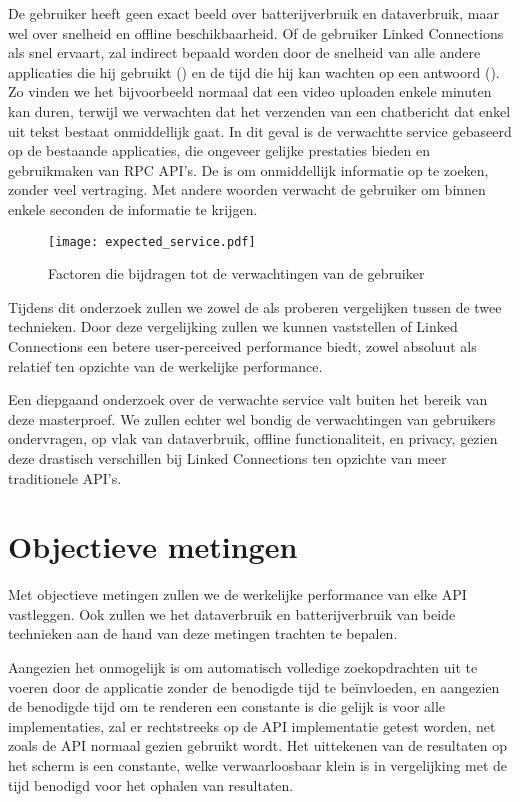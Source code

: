 De gebruiker heeft geen exact beeld over batterijverbruik en dataverbruik, maar wel over snelheid en offline beschikbaarheid. Of de gebruiker Linked Connections als snel ervaart, zal indirect bepaald worden door de snelheid van alle andere applicaties die hij gebruikt () en de tijd die hij kan wachten op een antwoord (). Zo vinden we het bijvoorbeeld normaal dat een video uploaden enkele minuten kan duren, terwijl we verwachten dat het verzenden van een chatbericht dat enkel uit tekst bestaat onmiddellijk gaat. In dit geval is de verwachtte service gebaseerd op de bestaande applicaties, die ongeveer gelijke prestaties bieden en gebruikmaken van RPC API's. De  is om onmiddellijk informatie op te zoeken, zonder veel vertraging. Met andere woorden verwacht de gebruiker om binnen enkele seconden de informatie te krijgen.

\begin{figure}[h]
	\centering
	\texttt{[image: expected\_service.pdf]}
	\caption[Factoren die bijdragen tot de verwachtingen van de gebruiker]{Factoren die bijdragen tot de verwachtingen van de gebruiker}
	\label{fig:expectedserviceperceivedservice}
\end{figure}

Tijdens dit onderzoek zullen we zowel de  als  proberen vergelijken tussen de twee technieken. Door deze vergelijking zullen we kunnen vaststellen of Linked Connections een betere user-perceived performance biedt, zowel absoluut als relatief ten opzichte van de werkelijke performance.

Een diepgaand onderzoek over de verwachte service valt buiten het bereik van deze masterproef. We zullen echter wel bondig de verwachtingen van gebruikers ondervragen, op vlak van dataverbruik, offline functionaliteit, en privacy, gezien deze drastisch verschillen bij Linked Connections ten opzichte van meer traditionele API's.

\section{Objectieve metingen}

Met objectieve metingen zullen we de werkelijke performance van elke API vastleggen. Ook zullen we het dataverbruik en batterijverbruik van beide technieken aan de hand van deze metingen trachten te bepalen.

Aangezien het onmogelijk is om automatisch volledige zoekopdrachten uit te voeren door de applicatie zonder de benodigde tijd te beïnvloeden, en aangezien de benodigde tijd om te renderen een constante is die gelijk is voor alle implementaties, zal er rechtstreeks op de API implementatie getest worden, net zoals de API normaal gezien gebruikt wordt. Het uittekenen van de resultaten op het scherm is een constante, welke verwaarloosbaar klein is in vergelijking met de tijd benodigd voor het ophalen van resultaten.

